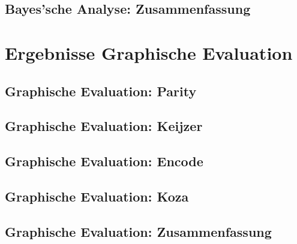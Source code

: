 \subsection{Bayes'sche Analyse: Zusammenfassung}
\label{subsec:bayesZusammenfassung}

\section{Ergebnisse Graphische Evaluation}
\label{sec:ergebnissePlots}

\subsection{Graphische Evaluation: Parity}
\label{subsec:plotsParity}

\subsection{Graphische Evaluation: Keijzer}
\label{subsec:plotsKeijzer}

\subsection{Graphische Evaluation: Encode}
\label{subsec:plotsEncode}

\subsection{Graphische Evaluation: Koza}
\label{subsec:plotsKoza}

\subsection{Graphische Evaluation: Zusammenfassung}
\label{subsec:plotsZusammenfassung}
